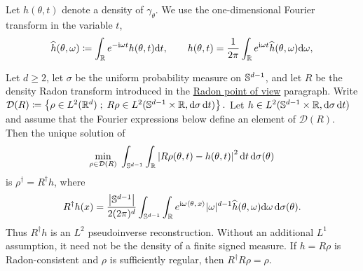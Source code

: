 Let $h(\theta,t)$ denote a density of $\gamma_\theta$. We use the one-dimensional Fourier transform in the variable $t$,
\begin{equation}\label{eq-radon-sinogram-fourier}
\widehat h(\theta,\omega)
\coloneqq
\int_{\mathbb{R}}e^{-\mathrm{i}\omega t}h(\theta,t)\mathrm{d} t,
\qquad
h(\theta,t)
=
\frac{1}{2\pi}\int_{\mathbb{R}}e^{\mathrm{i}\omega t}\widehat h(\theta,\omega)\mathrm{d}\omega,
\end{equation}
\begin{prop}\label{prop-radon-pseudoinverse}
Let $d\geq2$, let $\sigma$ be the uniform probability measure on $\mathbb{S}^{d-1}$, and let $R$ be the density Radon transform introduced in the \hyperref[rem-sliced-radon-viewpoint]{Radon point of view} paragraph. Write
\(\mathcal D(R) \coloneqq \left\{ \rho\in L^2(\mathbb{R}^d) \;;\; R\rho\in L^2(\mathbb{S}^{d-1}\times\mathbb{R},\mathrm{d}\sigma\,\mathrm{d} t) \right\}.\)
Let $h\in L^2(\mathbb{S}^{d-1}\times\mathbb{R},\mathrm{d}\sigma\,\mathrm{d} t)$ and assume that the Fourier expressions below define an element of $\mathcal D(R)$. Then the unique solution of
\begin{equation}\label{eq-radon-least-squares}
\underset{\rho\in\mathcal D(R)}{\min}\;
\int_{\mathbb{S}^{d-1}}\int_{\mathbb{R}}
\left\lvert R\rho(\theta,t)-h(\theta,t)\right\rvert^2
\mathrm{d} t\,\mathrm{d}\sigma(\theta)
\end{equation}
is $\rho^\dagger=R^\dagger h$, where
\begin{equation}\label{eq-radon-pseudoinverse}
R^\dagger h(x)
=
\frac{\left\lvert\mathbb{S}^{d-1}\right\rvert}{2(2\pi)^d}
\int_{\mathbb{S}^{d-1}}\int_{\mathbb{R}}
e^{\mathrm{i}\omega\langle \theta,\,x\rangle}
|\omega|^{d-1}
\widehat h(\theta,\omega)
\mathrm{d}\omega\,\mathrm{d}\sigma(\theta).
\end{equation}
Thus $R^\dagger h$ is an $L^2$ pseudoinverse reconstruction. Without an additional $L^1$ assumption, it need not be the density of a finite signed measure. If $h=R\rho$ is Radon-consistent and $\rho$ is sufficiently regular, then $R^\dagger R\rho=\rho$.
\end{prop}
